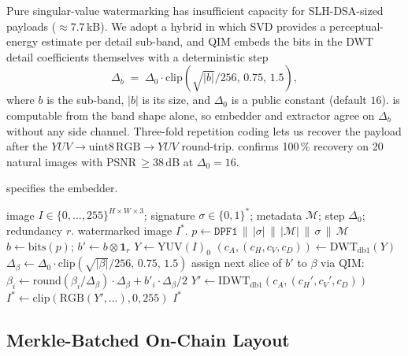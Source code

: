 \documentclass[11pt,a4paper]{article}
\theoremstyle{definition}
\theoremstyle{plain}
\theoremstyle{remark}
\begin{document}
Pure singular-value watermarking has insufficient capacity for
SLH-DSA-sized payloads ($\approx 7.7$\,kB). We adopt a hybrid in which
SVD provides a perceptual-energy estimate per detail sub-band, and QIM
embeds the bits in the DWT detail coefficients themselves with a
deterministic step
\begin{equation}\label{eq:step}
\Delta_{b}\;=\;\Delta_0\cdot\mathrm{clip}\!
\left(\sqrt{|b|}/256,\,0.75,\,1.5\right),
\end{equation}
where $b$ is the sub-band, $|b|$ is its size, and $\Delta_0$ is a public
constant (default $16$).  is computable from the band
shape alone, so embedder and extractor agree on $\Delta_b$ without any
side channel. Three-fold repetition coding lets us recover the payload
after the $\mathit{YUV}\!\to\!\mathrm{uint8\,RGB}\!\to\!\mathit{YUV}$
round-trip.  confirms 100\,\% recovery on 20 natural
images with PSNR\,$\geq\!38$\,dB at $\Delta_0 = 16$.

 specifies the embedder.

\begin{algorithm}[!ht]
\caption{Hybrid DWT--SVD QIM watermark embedder.}\label{alg:embed}
\begin{algorithmic}[1]
\Require image $I\in\{0,\dots,255\}^{H\times W\times 3}$;
         signature $\sigma\in\{0,1\}^{*}$;
         metadata $\mathcal{M}$;
         step $\Delta_0$; redundancy $r$.
\Ensure  watermarked image $I^{*}$.
\State $p \gets \texttt{DPF1} \,\|\, |\sigma| \,\|\, |\mathcal{M}| \,\|\, \sigma \,\|\, \mathcal{M}$
\State $b \gets \mathrm{bits}(p)$;\quad
       $b' \gets b \otimes \mathbf{1}_r$ 
\State $Y \gets \mathrm{YUV}(I)_0$
\State $(c_A, (c_H, c_V, c_D)) \gets \mathrm{DWT}_{\mathrm{db1}}(Y)$
    \State $\Delta_\beta \gets \Delta_0\cdot\mathrm{clip}(\sqrt{|\beta|}/256,\,0.75,\,1.5)$
    \State assign next slice of $b'$ to $\beta$ via QIM:
           $\beta_i \gets \mathrm{round}(\beta_i / \Delta_\beta)\!\cdot\!\Delta_\beta + b'_i \cdot \Delta_\beta / 2$
\EndFor
\State $Y' \gets \mathrm{IDWT}_{\mathrm{db1}}(c_A,(c_H',c_V',c_D))$
\State $I^{*} \gets \mathrm{clip}(\mathrm{RGB}(Y',\dots), 0, 255)$
\State \Return $I^{*}$
\end{algorithmic}
\end{algorithm}

\subsection{Merkle-Batched On-Chain Layout}\label{sec:batch}
\end{document}
